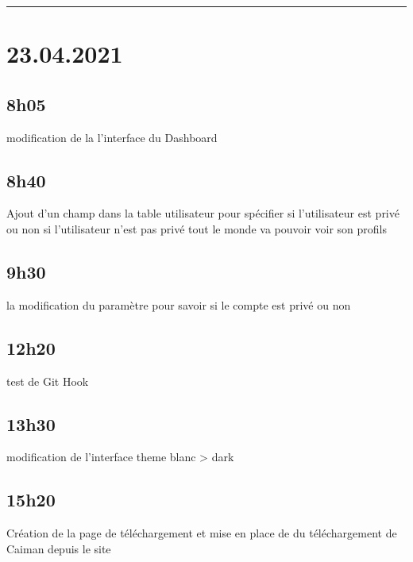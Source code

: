 \documentclass[a4paper,12pt,french]{sphinxmanual}
\begin{document}
\bigskip\hrule\bigskip



\section{23.04.2021}
\label{\detokenize{logbook:id19}}

\subsection{8h05}
\label{\detokenize{logbook:id20}}
\sphinxAtStartPar
modification de la l’interface du Dashboard


\subsection{8h40}
\label{\detokenize{logbook:id21}}
\sphinxAtStartPar
Ajout d’un champ dans la table utilisateur pour spécifier si l’utilisateur est privé ou non
si l’utilisateur n’est pas privé tout le monde va pouvoir voir son profils


\subsection{9h30}
\label{\detokenize{logbook:id22}}
\sphinxAtStartPar
la modification du paramètre pour savoir si le compte est privé ou non


\subsection{12h20}
\label{\detokenize{logbook:id23}}
\sphinxAtStartPar
test de Git Hook


\subsection{13h30}
\label{\detokenize{logbook:id24}}
\sphinxAtStartPar
modification de l’interface theme blanc \sphinxhyphen{}> dark


\subsection{15h20}
\label{\detokenize{logbook:id25}}
\sphinxAtStartPar
Création de la page de téléchargement et mise en place de du téléchargement de Caiman depuis le site
\end{document}
